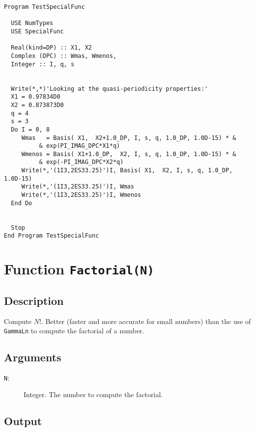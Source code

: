 \begin{lstlisting}[emph=Basis,
                   emphstyle=\color{blue},
                   frame=trBL,
                   caption=Computing the bassi of a special Hilbert
                   space (details in~\cite{Gonzalez-Arroyo:2004xu}).,
                   label=basis]
Program TestSpecialFunc

  USE NumTypes
  USE SpecialFunc

  Real(kind=DP) :: X1, X2
  Complex (DPC) :: Wmas, Wmenos,
  Integer :: I, q, s


  Write(*,*)'Looking at the quasi-periodicity properties:'
  X1 = 0.97834D0
  X2 = 0.873873D0
  q = 4
  s = 3
  Do I = 0, 8
     Wmas   = Basis( X1,  X2+1.0_DP, I, s, q, 1.0_DP, 1.0D-15) * &
          & exp(PI_IMAG_DPC*X1*q)
     Wmenos = Basis( X1+1.0_DP,  X2, I, s, q, 1.0_DP, 1.0D-15) * &
          & exp(-PI_IMAG_DPC*X2*q)
     Write(*,'(1I3,2ES33.25)')I, Basis( X1,  X2, I, s, q, 1.0_DP, 1.0D-15)
     Write(*,'(1I3,2ES33.25)')I, Wmas
     Write(*,'(1I3,2ES33.25)')I, Wmenos
  End Do


  Stop
End Program TestSpecialFunc
\end{lstlisting}

\section{Function \texttt{Factorial(N)}}

\subsection{Description}

Compute $N!$. Better (faster and more accurate for small numbers) than
the use of \texttt{GammaLn} to compute the factorial of a number.

\subsection{Arguments}

\begin{description}
\item[\texttt{N}:] Integer. The number to compute the factorial.
\end{description}

\subsection{Output}


